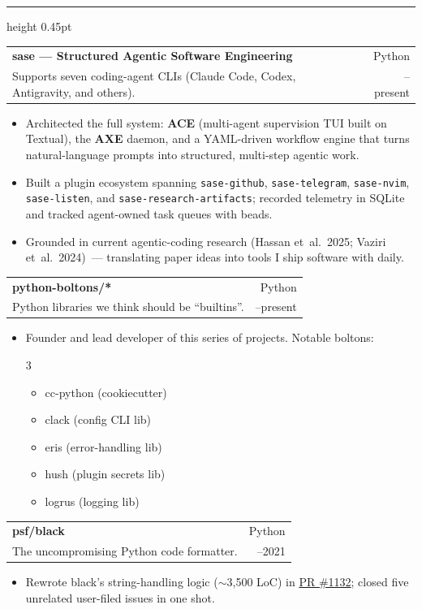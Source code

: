 \documentclass[letterpaper,10pt]{article}
\makeatletter
\newcommand{\resheading}[1]{%
  \par\addvspace{10pt}%
  \noindent
  {\bfseries\color{lcforest}\fontsize{10pt}{12pt}\selectfont%
   \textls*[90]{\MakeUppercase{#1}}}%
  \hspace{0.65em}%
  {\color{lcline}\leaders\hrule height 0.45pt\hfill\kern0pt}%
  \par\nobreak\addvspace{3pt}%
}
\newcommand{\projsubheading}[4]{%
  \par\addvspace{3pt}%
  \noindent
  \begin{tabular*}{\textwidth}{@{}l@{\extracolsep{\fill}}r@{}}
    {\bfseries\color{lcink}\fontsize{10.4pt}{12.4pt}\selectfont #1} &
    {\ttfamily\color{lcslate}\fontsize{8.6pt}{10.3pt}\selectfont #2} \\[0.5pt]
    {\color{lcink}\fontsize{9.9pt}{11.7pt}\selectfont #3} &
    {\color{lcslate}\fontsize{8.8pt}{10.5pt}\selectfont #4}
  \end{tabular*}\par\vspace{-3pt}
}
\makeatother
\begin{document}
\resheading{Selected Projects}

\projsubheading{sase --- Structured Agentic Software Engineering}{Python}{Supports seven coding-agent CLIs (Claude Code, Codex, Antigravity, and others).}{2025--present}
\begin{itemize}
  \item Architected the full system: \textbf{ACE} (multi-agent supervision TUI built on Textual), the \textbf{AXE} daemon, and a YAML-driven workflow engine that turns natural-language prompts into structured, multi-step agentic work.
  \item Built a plugin ecosystem spanning \texttt{sase-github}, \texttt{sase-telegram}, \texttt{sase-nvim}, \texttt{sase-listen}, and \texttt{sase-research-artifacts}; recorded telemetry in SQLite and tracked agent-owned task queues with beads.
  \item Grounded in current agentic-coding research (Hassan et~al.\ 2025; Vaziri et~al.\ 2024)~--- translating paper ideas into tools I ship software with daily.
\end{itemize}

\projsubheading{python-boltons/*}{Python}{Python libraries we think should be ``builtins''.}{2021--present}
\begin{itemize}
  \item Founder and lead developer of this series of projects. Notable boltons:
  \vspace{-0.34cm}
  \begin{multicols}{3}
    \begin{itemize}
      \item cc-python (cookiecutter)
      \item clack (config CLI lib)
      \item eris (error-handling lib)
      \item hush (plugin secrets lib)
      \item logrus (logging lib)
    \end{itemize}
  \end{multicols}
  \vspace{-0.36cm}
\end{itemize}

\projsubheading{psf/black}{Python}{The uncompromising Python code formatter.}{2019--2021}
\begin{itemize}
  \item Rewrote black's string-handling logic ($\sim$3{,}500 LoC) in \href{https://github.com/psf/black/pull/1132}{PR \#1132}; closed five unrelated user-filed issues in one shot.
\end{itemize}
\end{document}
